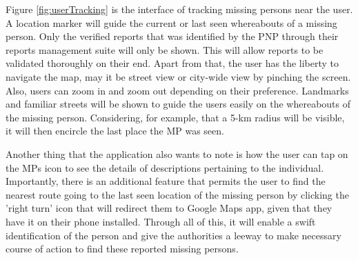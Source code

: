 Figure \ref{fig:userTracking} is the interface of tracking missing persons near the user. A location marker will guide the current or last seen whereabouts of a missing person. Only the verified reports that was identified by the PNP through their reports management suite will only be shown. This will allow reports to be validated thoroughly on their end. Apart from that, the user has the liberty to navigate the map, may it be street view or city-wide view by pinching the screen. Also, users can zoom in and zoom out depending on their preference. Landmarks and familiar streets will be shown to guide the users easily on the whereabouts of the missing person. Considering, for example, that a 5-km radius will be visible, it will then encircle the last place the MP was seen.

Another thing that the application also wants to note is how the user can tap on the MPs icon to see the details of descriptions pertaining to the individual. Importantly, there is an additional feature that permits the user to find the nearest route going to the last seen location of the missing person by clicking the 'right turn' icon that will redirect them to Google Maps app, given that they have it on their phone installed. Through all of this, it will enable a swift identification of the person and give the authorities a leeway to make necessary course of action to find these reported missing persons.

